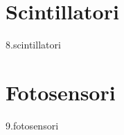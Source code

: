\documentclass[12pt]{book}
\newcommand{\comment}[1]{}
\begin{document}
\chapter{Scintillatori}
{8.scintillatori}

\chapter{Fotosensori}
{9.fotosensori}

\comment{%

\chapter{Rivelatori a semiconduttore}
{10.rivelatori_a_semiconduttori}

\chapter{La tecnologia del vuoto}
{11.tecnologie_vuoto}

\chapter{Elettronica}\label{chap:elettronica}
{12.elettronica}

\chapter{Metodo Monte Carlo}
{13.montecarlo}

\chapter{Esperienze di laboratorio}
{14.esperienze}

\appendix

\chapter{Distribuzione di Poisson}
{A.distribuzione_Poisson}

\chapter{Multimetro digitale}
{B.multimetro}

}%
\end{document}
